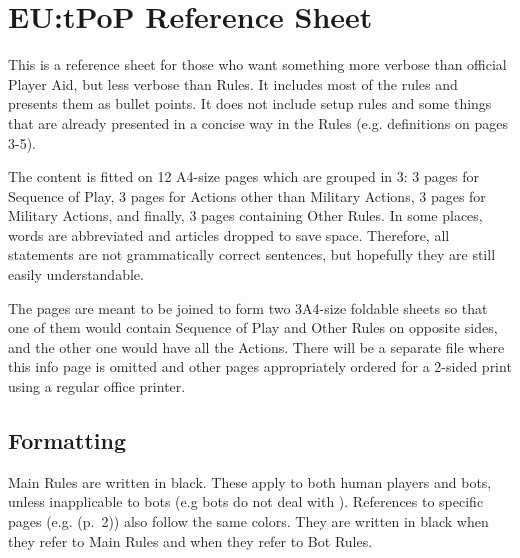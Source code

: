 \documentclass[10pt]{article}
\begin{document}
\thispagestyle{empty}

\section*{EU:tPoP Reference Sheet}

This is a reference sheet for those who want something more verbose than official Player Aid,
but less verbose than Rules.
It includes most of the rules and presents them as bullet points.
It does not include setup rules and some things that are already presented in a concise way
in the Rules (e.g. definitions on pages 3-5).


The content is fitted on 12 A4-size pages which are grouped in 3:
3 pages for Sequence of Play, 3 pages for Actions other than Military Actions,
3 pages for Military Actions, and finally, 3 pages containing Other Rules. In some places, words are abbreviated and articles dropped to save space. Therefore, all statements are not grammatically correct sentences, but hopefully they are still easily understandable.


The pages are meant to be joined to form two 3\texttimes A4-size foldable sheets so that
one of them would contain Sequence of Play and Other Rules on opposite sides,
and the other one would have all the Actions.
There will be a separate file where this info page is omitted and other pages appropriately ordered
for a 2-sided print using a regular office printer.


\subsection*{Formatting}

Main Rules are written in black. These apply to both human players and bots,
unless inapplicable to bots (e.g bots do not deal with \ducats).
References to specific pages (e.g. \dprime(p.~2)\dprime) also follow the same colors.
They are written in black when they refer to Main Rules and 
when they refer to Bot Rules.
\end{document}
